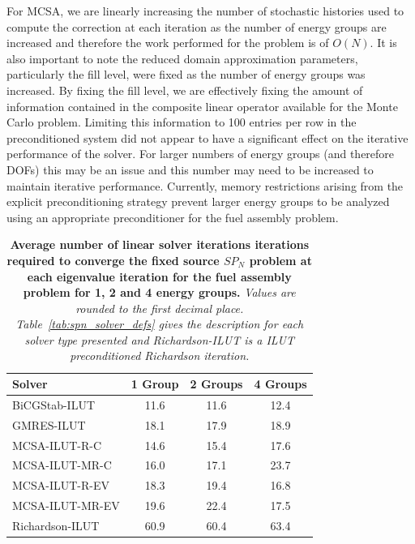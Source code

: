 For MCSA, we are linearly increasing the number of stochastic
histories used to compute the correction at each iteration as the
number of energy groups are increased and therefore the work performed
for the problem is of $O(N)$. It is also important to note the reduced
domain approximation parameters, particularly the fill level, were
fixed as the number of energy groups was increased. By fixing the fill
level, we are effectively fixing the amount of information contained
in the composite linear operator available for the Monte Carlo
problem. Limiting this information to 100 entries per row in the
preconditioned system did not appear to have a significant effect on
the iterative performance of the solver. For larger numbers of energy
groups (and therefore DOFs) this may be an issue and this number may
need to be increased to maintain iterative performance. Currently,
memory restrictions arising from the explicit preconditioning strategy
prevent larger energy groups to be analyzed using an appropriate
preconditioner for the fuel assembly problem.

\begin{table}[h!]
  \begin{center}
    \begin{tabular}{lccc}\hline\hline
      \multicolumn{1}{l}{Solver}&
      \multicolumn{1}{c}{1 Group}&
      \multicolumn{1}{c}{2 Groups}&
      \multicolumn{1}{c}{4 Groups}\\
      \hline
      BiCGStab-ILUT & 11.6 & 11.6 & 12.4 \\ 
      GMRES-ILUT & 18.1 & 17.9 & 18.9 \\
      MCSA-ILUT-R-C & 14.6 & 15.4 & 17.6 \\
      MCSA-ILUT-MR-C & 16.0 & 17.1 & 23.7 \\
      MCSA-ILUT-R-EV & 18.3 & 19.4 & 16.8 \\
      MCSA-ILUT-MR-EV & 19.6 & 22.4 & 17.5 \\
      Richardson-ILUT & 60.9 & 60.4 & 63.4 \\
      \hline\hline
    \end{tabular}
  \end{center}
  \caption{\textbf{Average number of linear solver iterations
      iterations required to converge the fixed source $SP_N$ problem
      at each eigenvalue iteration for the fuel assembly problem for
      1, 2 and 4 energy groups.} \textit{Values are rounded to the
      first decimal place. Table~\ref{tab:spn_solver_defs} gives the
      description for each solver type presented and Richardson-ILUT
      is a ILUT preconditioned Richardson iteration.}}
  \label{tab:spn_comparison_iterations}
\end{table}

